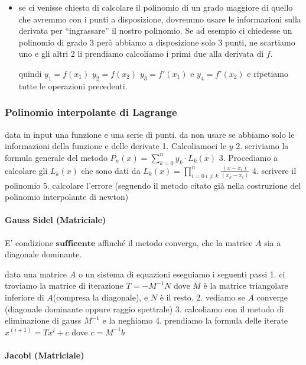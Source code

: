 \documentclass[
]{article}
\begin{document}
\begin{itemize}
\item
  se ci venisse chiesto di calcolare il polinomio di un grado maggiore
  di quello che avremmo con i punti a disposizione, dovremmo usare le
  informazioni sulla derivata per ``ingrassare'' il nostro polinomio. Se
  ad esempio ci chiedesse un polinomio di grado 3 però abbiamo a
  disposizione solo 3 punti, ne scartiamo uno e gli altri 2 li prendiamo
  calcoliamo i primi due alla derivata di \(f\).

  quindi \(y_{1} = f(x_{1})\) \(y_{2} = f(x_{2})\) \(y_{3} = f'(x_{1})\)
  e \(y_{4} = f'(x_{2})\) e ripetiamo tutte le operazioni precedenti.
\end{itemize}

\subsubsection{Polinomio interpolante di
Lagrange}\label{polinomio-interpolante-di-lagrange}

data in input una funzione e una serie di punti. da non usare se abbiamo
solo le informazioni della funzione e delle derivate 1. Calcoliamoci le
\(y\) 2. scriviamo la formula generale del metodo
\(P_{n}(x)=\sum_{k=0}^n y_k\cdot L_k(x)\) 3. Procediamo a calcolare gli
\(L_{k}(x)\) che sono dati da
\(L_k(x)=\prod_{i=0~i\neq k}^{n}\frac{(x-x_i)}{(x_k-x_i)}\) 4. scrivere
il polinomio 5. calcolare l'errore (seguendo il metodo citato già nella
costruzione del polinomio interpolante di newton)

\paragraph{Gauss Sidel (Matriciale)}\label{gauss-sidel-matriciale}

E' condizione \(\mathbf{sufficente}\) affinché il metodo converga, che
la matrice \(A\) sia a diagonale dominante.

data una matrice \(A\) o un sistema di equazioni eseguiamo i seguenti
passi 1. ci troviamo la matrice di iterazione \(T = -M^{-1} N\) dove
\(M\) è la matrice triangolare inferiore di \(A\)(compresa la
diagonale), e \(N\) è il resto. 2. vediamo se \(A\) converge (diagonale
dominante oppure raggio spettrale) 3. calcoliamo con il metodo di
eliminazione di gauss \(M^{-1}\) e la neghiamo 4. prendiamo la formula
delle iterate \(x^{(i+1)} = Tx^{i}+c\) dove \(c = M^{-1} b\)

\paragraph{Jacobi (Matriciale)}\label{jacobi-matriciale}
\end{document}
